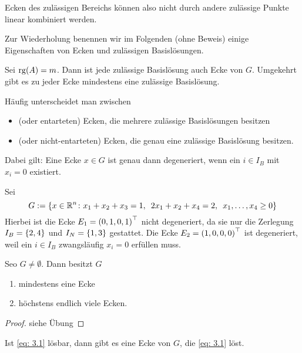 Ecken des zulässigen Bereichs können also nicht durch andere zulässige Punkte linear kombiniert werden.

Zur Wiederholung benennen wir im Folgenden (ohne Beweis) einige Eigenschaften von Ecken und zulässigen Basislösungen.

\begin{satz} %
	Sei $\operatorname{rg}(A) = m$. Dann ist jede zulässige Basislösung auch Ecke von $G$. Umgekehrt gibt es zu jeder Ecke mindestens eine zulässige Basislösung.
\end{satz}

Häufig unterscheidet man zwischen 
\begin{itemize}[nolistsep, topsep=-\parskip]
	\item {} (oder entarteten) Ecken, die mehrere zulässige Basislösungen besitzen
	\item {} (oder nicht-entarteten) Ecken, die genau eine zulässige Basislösung besitzen.
\end{itemize}
Dabei gilt: Eine Ecke $x \in G$ ist genau dann degeneriert, wenn ein $i \in I_B$ mit $x_i=0$ existiert.

\begin{beispiel} %
	Sei
	\begin{equation*}
		G \mathrel{:=} \left\{ x \in \mathbb{R}^n \colon x_1+x_2+x_3=1, \enskip 2x_1+x_2+x_4=2, \enskip x_1,\dots , x_4 \ge 0 \right\}
	\end{equation*}
	Hierbei ist die Ecke $E_1 = \left( 0,1,0,1 \right)^{\top}$ nicht degeneriert, da sie nur die Zerlegung $I_B = \left\{ 2,4 \right\}$ und $I_N = \left\{ 1,3 \right\}$ gestattet.
	Die Ecke $E_2 = \left( 1,0,0,0 \right)^{\top}$ ist degeneriert, weil ein $i \in I_B$ zwangsläufig $x_i = 0$ erfüllen muss.
\end{beispiel}

\begin{satz} %
	Seo $G \neq \emptyset$. Dann besitzt $G$
	\begin{enumerate}[nolistsep, topsep=-\parskip]
		\item mindestens eine Ecke
		\item höchstens endlich viele Ecken.
	\end{enumerate}
\end{satz}
\begin{proof}
	siehe Übung
\end{proof}

\begin{satz} %
	Ist \eqref{eq: 3.1} lösbar, dann gibt es eine Ecke von $G$, die \eqref{eq: 3.1} löst.
\end{satz}

